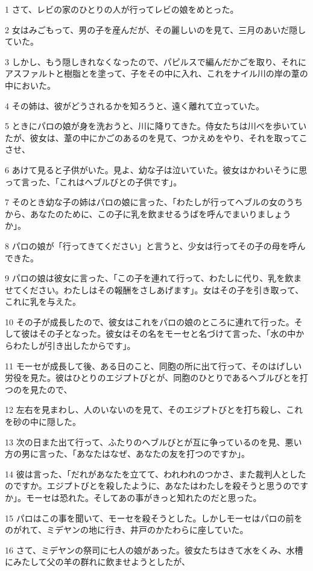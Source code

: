 \par 1 さて、レビの家のひとりの人が行ってレビの娘をめとった。
\par 2 女はみごもって、男の子を産んだが、その麗しいのを見て、三月のあいだ隠していた。
\par 3 しかし、もう隠しきれなくなったので、パピルスで編んだかごを取り、それにアスファルトと樹脂とを塗って、子をその中に入れ、これをナイル川の岸の葦の中においた。
\par 4 その姉は、彼がどうされるかを知ろうと、遠く離れて立っていた。
\par 5 ときにパロの娘が身を洗おうと、川に降りてきた。侍女たちは川べを歩いていたが、彼女は、葦の中にかごのあるのを見て、つかえめをやり、それを取ってこさせ、
\par 6 あけて見ると子供がいた。見よ、幼な子は泣いていた。彼女はかわいそうに思って言った、「これはヘブルびとの子供です」。
\par 7 そのとき幼な子の姉はパロの娘に言った、「わたしが行ってヘブルの女のうちから、あなたのために、この子に乳を飲ませるうばを呼んでまいりましょうか」。
\par 8 パロの娘が「行ってきてください」と言うと、少女は行ってその子の母を呼んできた。
\par 9 パロの娘は彼女に言った、「この子を連れて行って、わたしに代り、乳を飲ませてください。わたしはその報酬をさしあげます」。女はその子を引き取って、これに乳を与えた。
\par 10 その子が成長したので、彼女はこれをパロの娘のところに連れて行った。そして彼はその子となった。彼女はその名をモーセと名づけて言った、「水の中からわたしが引き出したからです」。
\par 11 モーセが成長して後、ある日のこと、同胞の所に出て行って、そのはげしい労役を見た。彼はひとりのエジプトびとが、同胞のひとりであるヘブルびとを打つのを見たので、
\par 12 左右を見まわし、人のいないのを見て、そのエジプトびとを打ち殺し、これを砂の中に隠した。
\par 13 次の日また出て行って、ふたりのヘブルびとが互に争っているのを見、悪い方の男に言った、「あなたはなぜ、あなたの友を打つのですか」。
\par 14 彼は言った、「だれがあなたを立てて、われわれのつかさ、また裁判人としたのですか。エジプトびとを殺したように、あなたはわたしを殺そうと思うのですか」。モーセは恐れた。そしてあの事がきっと知れたのだと思った。
\par 15 パロはこの事を聞いて、モーセを殺そうとした。しかしモーセはパロの前をのがれて、ミデヤンの地に行き、井戸のかたわらに座していた。
\par 16 さて、ミデヤンの祭司に七人の娘があった。彼女たちはきて水をくみ、水槽にみたして父の羊の群れに飲ませようとしたが、
